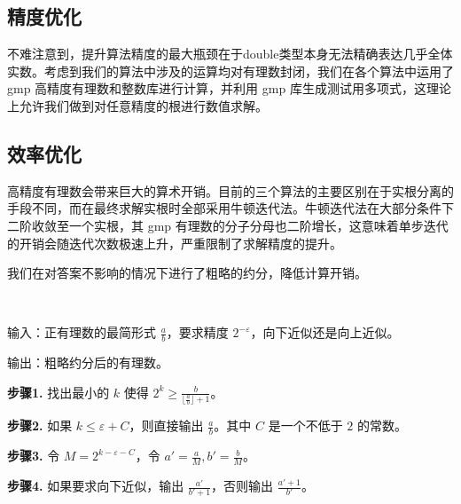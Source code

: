 \subsection{精度优化}

	不难注意到，提升算法精度的最大瓶颈在于double类型本身无法精确表达几乎全体实数。考虑到我们的算法中涉及的运算均对有理数封闭，我们在各个算法中运用了 gmp 高精度有理数和整数库进行计算，并利用 gmp 库生成测试用多项式，这理论上允许我们做到对任意精度的根进行数值求解。

\subsection{效率优化}

	高精度有理数会带来巨大的算术开销。目前的三个算法的主要区别在于实根分离的手段不同，而在最终求解实根时全部采用牛顿迭代法。牛顿迭代法在大部分条件下二阶收敛至一个实根，其 gmp 有理数的分子分母也二阶增长，这意味着单步迭代的开销会随迭代次数极速上升，严重限制了求解精度的提升。

	我们在对答案不影响的情况下进行了粗略的约分，降低计算开销。

\begin{algorithm}[粗略约分]~
	
	输入：正有理数的最简形式 $\frac{a}{b}$，要求精度 $2^{-\varepsilon}$，向下近似还是向上近似。
	
	输出：粗略约分后的有理数。
	
	\textbf{步骤1.} 找出最小的 $k$ 使得 $2^k \geq \frac{b}{\lfloor\frac{a}{b}\rfloor + 1}$。
	
	\textbf{步骤2.} 如果 $k \leq \varepsilon + C$，则直接输出 $\frac{a}{b}$。其中 $C$ 是一个不低于 $2$ 的常数。
	
	\textbf{步骤3.} 令 $M = 2^{k - \varepsilon - C}$，令 $a' = \frac{a}{M}, b' = \frac{b}{M}$。
	
	\textbf{步骤4.} 如果要求向下近似，输出 $\frac{a'}{b' + 1}$，否则输出 $\frac{a' + 1}{b'}$。
	
	
\end{algorithm}

